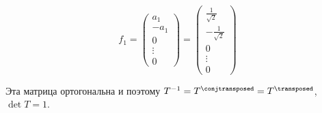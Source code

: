 \begin{propose}
    \[
             f_1
             = \begin{pmatrix}a_1 \\ -a_1 \\ 0 \\ \vdots \\ 0 \end{pmatrix}
             = \begin{pmatrix}\frac1{\sqrt2} \\ - \frac{1}{\sqrt2} \\ 0 \\ \vdots \\ 0 \end{pmatrix}
             \]

    Эта матрица ортогональна и поэтому
    \( T^{-1} = T^\conjtransposed = T^\transposed \),
    \( \det T = 1 \).
\end{propose}
